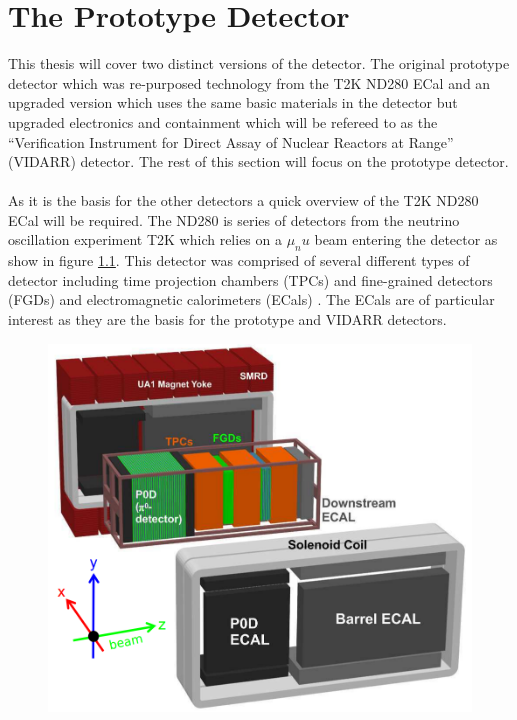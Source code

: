 
\chapter{The Prototype Detector}\label{Chp:ThePrototypeDetector}

\ifpdf
    \graphicspath{{Chapter2/Figs/Raster/}{Chapter2/Figs/PDF/}{Chapter2/Figs/}}
\else
    \graphicspath{{Chapter2/Figs/Vector/}{Chapter2/Figs/}}
\fi


This thesis will cover two distinct versions of the detector. The original prototype detector which was re-purposed technology from the T2K ND280 ECal \cite{Allan_2013} and an upgraded version which uses the same basic materials in the detector but upgraded electronics and containment which will be refereed to as the ``Verification Instrument for Direct Assay of Nuclear Reactors at Range'' (VIDARR) detector. The rest of this section will focus on the prototype detector.
\\\\As it is the basis for the other detectors a quick overview of the T2K ND280 ECal will be required. The ND280 is series of detectors from the neutrino oscillation experiment T2K which relies on a $\mu_nu$ beam entering the detector as show in figure \ref{fig:nd280Fig}. This detector was comprised of several different types of detector including time projection chambers (TPCs) and fine-grained detectors (FGDs) and electromagnetic calorimeters (ECals) \cite{Allan_2013}. The ECals are of particular interest as they are the basis for the prototype and VIDARR detectors. 
\begin{figure}[htbp]
 \centering
 \includegraphics[width=\linewidth/2]{Chapter2/Figs/Raster/ND280Fig.png} 
 \label{fig:nd280Fig}
\end{figure}

